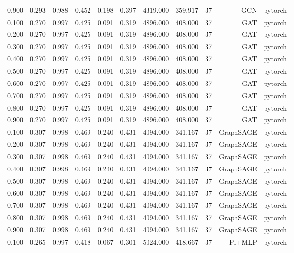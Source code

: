 \begin{tabular}{lrrrrrrrrrr}
0.900 & 0.293 & 0.988 & 0.452 & 0.198 & 0.397 & 4319.000 & 359.917 & 37 & GCN & pytorch \\
0.100 & 0.270 & 0.997 & 0.425 & 0.091 & 0.319 & 4896.000 & 408.000 & 37 & GAT & pytorch \\
0.200 & 0.270 & 0.997 & 0.425 & 0.091 & 0.319 & 4896.000 & 408.000 & 37 & GAT & pytorch \\
0.300 & 0.270 & 0.997 & 0.425 & 0.091 & 0.319 & 4896.000 & 408.000 & 37 & GAT & pytorch \\
0.400 & 0.270 & 0.997 & 0.425 & 0.091 & 0.319 & 4896.000 & 408.000 & 37 & GAT & pytorch \\
0.500 & 0.270 & 0.997 & 0.425 & 0.091 & 0.319 & 4896.000 & 408.000 & 37 & GAT & pytorch \\
0.600 & 0.270 & 0.997 & 0.425 & 0.091 & 0.319 & 4896.000 & 408.000 & 37 & GAT & pytorch \\
0.700 & 0.270 & 0.997 & 0.425 & 0.091 & 0.319 & 4896.000 & 408.000 & 37 & GAT & pytorch \\
0.800 & 0.270 & 0.997 & 0.425 & 0.091 & 0.319 & 4896.000 & 408.000 & 37 & GAT & pytorch \\
0.900 & 0.270 & 0.997 & 0.425 & 0.091 & 0.319 & 4896.000 & 408.000 & 37 & GAT & pytorch \\
0.100 & 0.307 & 0.998 & 0.469 & 0.240 & 0.431 & 4094.000 & 341.167 & 37 & GraphSAGE & pytorch \\
0.200 & 0.307 & 0.998 & 0.469 & 0.240 & 0.431 & 4094.000 & 341.167 & 37 & GraphSAGE & pytorch \\
0.300 & 0.307 & 0.998 & 0.469 & 0.240 & 0.431 & 4094.000 & 341.167 & 37 & GraphSAGE & pytorch \\
0.400 & 0.307 & 0.998 & 0.469 & 0.240 & 0.431 & 4094.000 & 341.167 & 37 & GraphSAGE & pytorch \\
0.500 & 0.307 & 0.998 & 0.469 & 0.240 & 0.431 & 4094.000 & 341.167 & 37 & GraphSAGE & pytorch \\
0.600 & 0.307 & 0.998 & 0.469 & 0.240 & 0.431 & 4094.000 & 341.167 & 37 & GraphSAGE & pytorch \\
0.700 & 0.307 & 0.998 & 0.469 & 0.240 & 0.431 & 4094.000 & 341.167 & 37 & GraphSAGE & pytorch \\
0.800 & 0.307 & 0.998 & 0.469 & 0.240 & 0.431 & 4094.000 & 341.167 & 37 & GraphSAGE & pytorch \\
0.900 & 0.307 & 0.998 & 0.469 & 0.240 & 0.431 & 4094.000 & 341.167 & 37 & GraphSAGE & pytorch \\
0.100 & 0.265 & 0.997 & 0.418 & 0.067 & 0.301 & 5024.000 & 418.667 & 37 & PI+MLP & pytorch \\

\end{tabular}
